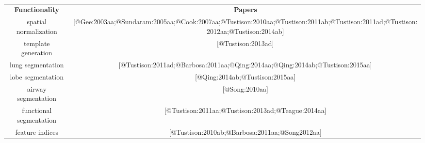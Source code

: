 
\begin{table}[!t]
  \small
   \centering
    \begin{tabular*}{0.75\textwidth}{c @{\extracolsep{\fill}} c}
    \toprule
    {\bf Functionality} & {\bf Papers}\\
    \cmidrule[1pt](lr){1-2}
    spatial normalization & [@Gee:2003aa;@Sundaram:2005aa;@Cook:2007aa;@Tustison:2010aa;@Tustison:2011ab;@Tustison:2011ad;@Tustison:2012aa;@Tustison:2014ab] \\
    template generation & [@Tustison:2013ad]  \\
    lung segmentation & { [@Tustison:2011ad;@Barbosa:2011aa;@Qing:2014aa;@Qing:2014ab;@Tustison:2015aa] }  \\
    lobe segmentation & { [@Qing:2014ab;@Tustison:2015aa] }  \\
    airway segmentation & [@Song:2010aa]  \\
    functional segmentation & [@Tustison:2011aa;@Tustison:2013ad;@Teague:2014aa] \\
    feature indices & { [@Tustison:2010ab;@Barbosa:2011aa;@Song2012aa] } \\
    \bottomrule
   \end{tabular*}
 \label{table:papers}
 \caption{
 }

\end{table}
